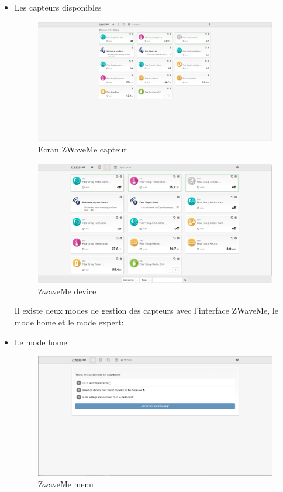 \begin{itemize}
\item Les capteurs disponibles

\begin{figure}[h]
	\center
	\includegraphics[scale=0.4]{./Images/png/ecranCapteur.png}
	\caption{Ecran ZWaveMe capteur}
\end{figure}
\clearpage



\begin{figure}[h]
	\center
\includegraphics[scale=0.4]{./Images/png/device_zwaveme.png}
	\caption{ZwaveMe device}
\end{figure}
\clearpage


Il existe deux modes de gestion des capteurs avec l'interface ZWaveMe, le mode home et le mode expert:


\item Le mode home

\begin{figure}[h]
	\center
\includegraphics[scale=0.4]{./Images/png/home_zwaveme.png}
	\caption{ZwaveMe menu}
\end{figure}
\clearpage


\end{itemize}

